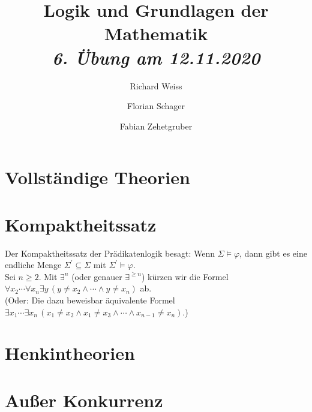 \documentclass{article}
\title
{
  Logik und Grundlagen der Mathematik \\
  \vspace{4pt}
  \normalsize
  \textit{6. Übung am 12.11.2020}
}
\author
{
  Richard Weiss
  \and
  Florian Schager
  \and
  Fabian Zehetgruber
}
\date{}
\begin{document}
\maketitle
\section*{Vollständige Theorien}




\section*{Kompaktheitssatz}
Der Kompaktheitssatz der Prädikatenlogik besagt: Wenn $\Sigma \vDash \varphi$,
dann gibt es eine endliche Menge $\Sigma^{\prime} \subseteq \Sigma$ mit $\Sigma^{\prime} \vDash \varphi$. \\
Sei $n \geq 2$. Mit $\exists^n$ (oder genauer $\exists^{\geq n}$) kürzen wir die Formel
$\forall x_2\cdots\forall x_n \exists y\, (y \neq x_2 \land \cdots \land y \neq x_n)$ ab. \\
(Oder: Die dazu beweisbar äquivalente Formel $\exists x_1 \cdots \exists x_n\, (x_1 \neq x_2 \land x_1 \neq x_3
\land \cdots \land x_{n-1} \neq x_n)$.)






\section*{Henkintheorien}



\section*{Außer Konkurrenz}





\end{document}
